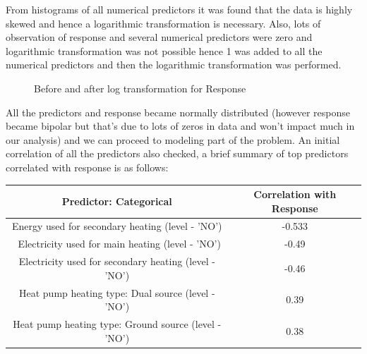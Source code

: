 \documentclass[letterpaper,12pt]{article}
\begin{document}
\setlength{\parindent}{0em}
From histograms of all numerical predictors it was found that the data is highly skewed and hence a logarithmic transformation is necessary. Also, lots of observation of response and several numerical predictors were zero and logarithmic transformation was not possible hence 1 was added to all the numerical predictors and then the logarithmic transformation was performed. 
\begin{figure}[H]%
    \centering
    \qquad
    \label{fig:example}%
    \caption{Before and after log transformation for Response}
\end{figure}

All the predictors and response became normally distributed (however response became bipolar but that's due to lots of zeros in data and won't impact much in our analysis) and we can proceed to modeling part of the problem.
An initial correlation of all the predictors also checked, a brief summary of top predictors correlated with response is as follows:

\begin{table} [H]
\centering 
\begin{tabular}{|c|c|} 
\hline 
Predictor: Categorical & Correlation with Response \\\hline 
Energy used for secondary heating (level - 'NO') & -0.533 \\\
Electricity used for main heating (level - 'NO') & -0.49 \\
Electricity used for secondary heating (level - 'NO') & -0.46 \\
Heat pump heating type: Dual source (level - 'NO') & 0.39 \\
Heat pump heating type: Ground source (level - 'NO') & 0.38\\\hline 
\end{tabular} 
\end{table} 
\end{document}
